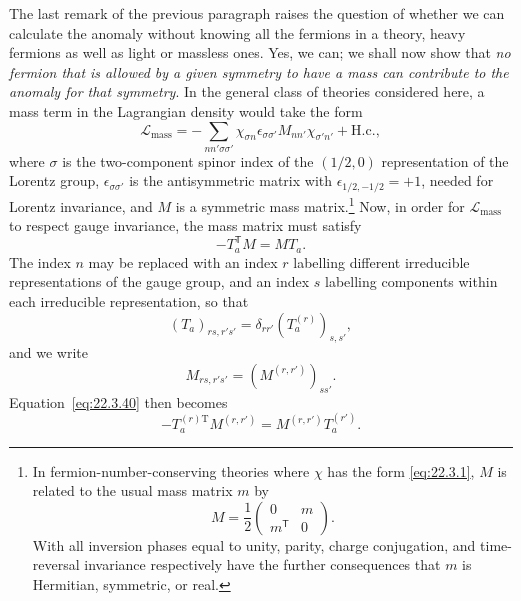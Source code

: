 The last remark of the previous paragraph raises the question of whether
we can calculate the anomaly without knowing all the fermions in a theory,
heavy fermions as well as light or massless ones. Yes, we can; we shall now
show that \emph{no fermion that is allowed by a given symmetry to have a
mass can contribute to the anomaly for that symmetry}. In the general
class of theories considered here, a mass term in the Lagrangian density
would take the form
\begin{equation}
 \mathcal L_{\mathrm{mass}}
 =-\sum_{nn'\sigma\sigma'}
 \chi_{\sigma n}\epsilon_{\sigma\sigma'}M_{nn'}\chi_{\sigma'n'}
 +\mathrm{H.c.},
 \tag{22.3.39}\label{eq:22.3.39}
\end{equation}
where $\sigma$ is the two-component spinor index of the $(1/2,0)$
representation of the Lorentz group, $\epsilon_{\sigma\sigma'}$ is the
antisymmetric matrix with $\epsilon_{1/2,-1/2}=+1$, needed for Lorentz
invariance, and $M$ is a symmetric mass matrix.\footnote{In
fermion-number-conserving theories where $\chi$ has the form
\eqref{eq:22.3.1}, $M$ is related to the usual mass matrix $m$ by
\[
 M=\frac12
 \begin{pmatrix}
  0&m\\
  m^{\mathsf T}&0
 \end{pmatrix}.
\]
With all inversion phases equal to unity, parity, charge conjugation, and
time-reversal invariance respectively have the further consequences that
$m$ is Hermitian, symmetric, or real.} Now, in order for
$\mathcal L_{\mathrm{mass}}$ to respect gauge invariance, the mass matrix
must satisfy
\begin{equation}
 -T_a^{\mathsf T}M=MT_a.
 \tag{22.3.40}\label{eq:22.3.40}
\end{equation}
The index $n$ may be replaced with an index $r$ labelling different
irreducible representations of the gauge group, and an index $s$ labelling
components within each irreducible representation, so that
\begin{equation}
 (T_a)_{rs,r's'}=\delta_{rr'}(T_a^{(r)})_{s,s'},
 \tag{22.3.41}\label{eq:22.3.41}
\end{equation}
and we write
\begin{equation}
 M_{rs,r's'}=(M^{(r,r')})_{ss'}.
 \tag{22.3.42}\label{eq:22.3.42}
\end{equation}
Equation~\eqref{eq:22.3.40} then becomes
\begin{equation}
 -T_a^{(r)\mathrm T}M^{(r,r')}
 =M^{(r,r')}T_a^{(r')}.
 \tag{22.3.43}\label{eq:22.3.43}
\end{equation}
